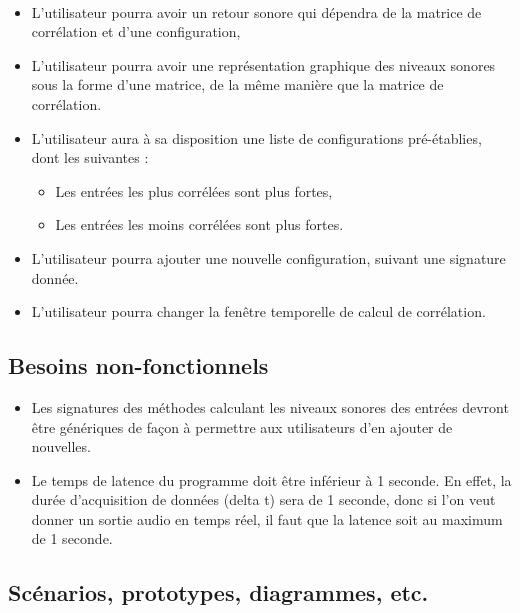 \documentclass{article}
\begin{document}
    \paragraph{}
    \begin{itemize}
      \item L'utilisateur pourra avoir un retour sonore qui dépendra de la
      matrice de corrélation et d'une configuration,
      \item L'utilisateur pourra avoir une représentation graphique des niveaux
      sonores sous la forme d'une matrice, de la même manière que la matrice de
      corrélation.
      \item L'utilisateur aura à sa disposition une liste de configurations
      pré-établies, dont les suivantes :
      \begin{itemize}
        \item Les entrées les plus corrélées sont plus fortes,
        \item Les entrées les moins corrélées sont plus fortes.
      \end{itemize}
      \item L'utilisateur pourra ajouter une nouvelle configuration, suivant
      une signature donnée.
      \item L'utilisateur pourra changer la fenêtre temporelle de calcul de
      corrélation.
    \end{itemize}
    \subsection{Besoins non-fonctionnels}
    \begin{itemize}
      \item Les signatures des méthodes calculant les niveaux sonores des
      entrées devront être génériques de façon à permettre aux utilisateurs d'en
      ajouter de nouvelles.
      \item Le temps de latence du programme doit être inférieur à 1 seconde.
      En effet, la durée d'acquisition de données (delta t) sera de 1 seconde,
      donc si l'on veut donner un sortie audio en temps réel, il faut que la latence
      soit au maximum de 1 seconde.
    \end{itemize}
    \subsection{Scénarios, prototypes, diagrammes, etc.}
\end{document}

